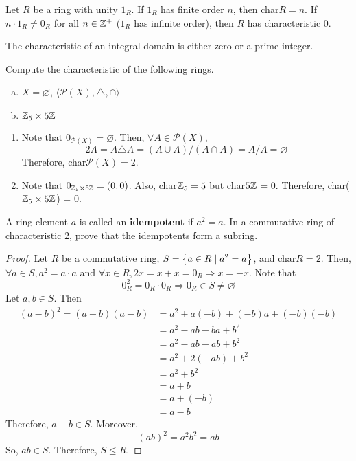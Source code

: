 \begin{theorem}
    Let $R$ be a ring with unity $1_R$. If $1_R$ has finite order $n$, then char$R = n$. If $n \cdot 1_R \neq 0_R$ for all $n \in \mathbb{Z}^+$ ($1_R$ has infinite order), then $R$ has characteristic $0$.  
\end{theorem}

\begin{theorem}
    The characteristic of an integral domain is either zero or a prime integer.
\end{theorem}

\begin{exercise}
    Compute the characteristic of the following rings.
    \begin{enumerate}[a.]
        \item $X = \varnothing$, $\langle \mathcal{P}(X), \triangle, \cap \rangle$
        \item $\mathbb{Z}_5 \times 5\mathbb{Z}$
    \end{enumerate}
\end{exercise}

\begin{solution} \phantom{blank}
    \begin{enumerate}
        \item Note that $0_{\mathcal{P}(X)} = \varnothing$. Then, $\forall A \in \mathcal{P}(X)$,
        \[ 2A = A \triangle A = (A \cup A) / (A \cap A) = A / A = \varnothing \]
        Therefore, char$\mathcal{P}(X) = 2$.
        
        \item Note that $0_{\mathbb{Z}_5 \times 5\mathbb{Z}} = (0, 0)$. Also, char$\mathbb{Z}_5 = 5$ but char$5\mathbb{Z}$ = 0. Therefore, char($\mathbb{Z}_5 \times 5\mathbb{Z}$) = 0.
    \end{enumerate}
\end{solution}

\begin{exercise}
    A ring element $a$ is called an \textbf{idempotent} if $a^2 = a$. In a commutative ring of characteristic 2, prove that the idempotents form a subring.
\end{exercise}

\begin{proof}
    Let $R$ be a commutative ring, $S= \qty{a \in R \mid a^2 = a}$, and char$R = 2$. Then, $\forall a \in S, a^2 = a \cdot a$ and $\forall x \in R, 2x = x + x = 0_R \Rightarrow x = -x$. Note that 
        \[ 0_R^2 = 0_R \cdot 0_R \Rightarrow 0_R \in S \neq \varnothing \]
    Let $a,  b \in S$. Then
    \begin{align*}
        (a - b)^2 = (a - b)(a - b) &= a^2 + a(-b) + (-b)a + (-b)(-b) \\
        &= a^2 - ab - ba + b^2 \\
        &= a^2 - ab - ab + b^2 \\
        &= a^2 + 2(-ab) + b^2 \\
        &= a^2 + b^2 \\
        &= a + b \\
        &= a + (-b) \\
        &= a - b
    \end{align*}
    Therefore, $a - b \in S$. Moreover, 
    \[ (ab)^2 = a^2b^2 = ab \]
    So, $ab \in S$. Therefore, $S \leq R$. \qedsymbol
\end{proof}
